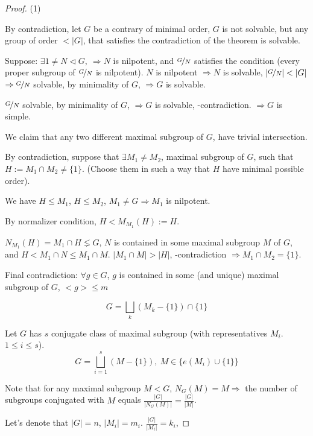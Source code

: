 \documentclass[12pt, a4paper]{article}
\theoremstyle{definition}
\begin{document}
\begin{proof}
    (1) \par
    By contradiction, let $G$ be a contrary of minimal order, $G$ is not solvable, but any 
    group of order $<|G|$, that satisfies the contradiction of the theorem is solvable.
    \par
    Suppose: $\exists 1\neq N\lhd G,\ \Rightarrow N $ is nilpotent, and $\nicefrac{G}{N} $ 
    satisfies the condition (every proper subgroup of $\nicefrac{G}{N} $ is nilpotent). $N$
    is nilpotent $\Rightarrow N $ is solvable, $|\nicefrac{G}{N}|<|G| $ $\Rightarrow 
    \nicefrac{G}{N} $ solvable, by minimality of $G$, $\Rightarrow G$ is solvable. 
    \par
    $\nicefrac{G}{N} $ solvable, by minimality of $G$, $\Rightarrow G$ is solvable, 
    -contradiction. $\Rightarrow G$ is simple.
    \par
    We claim that any two different maximal subgroup of $G$, have trivial intersection.
    \par
    By contradiction, suppose that $\exists M_1 \neq M_2 $, maximal subgroup of $G$, such 
    that $H:=M_1\cap M_2 \neq \{1\}$. (Choose them in such a way that $H$ have minimal 
    possible order).
    \par
    We have $H\leqslant M_1$, $H\leqslant M_2$, $M_1 \neq G \Rightarrow M_1 $ is nilpotent.
    \par
    By normalizer condition, $H <M_{M_1}(H):=H $.
    \par
    $N_{M_1}(H)  =M_1\cap H\lneq G $, $N$ is contained in some maximal subgroup $M$ of $G$, 
    and $H<M_1 \cap N \leqslant M_1 \cap M$.
    $|M_1\cap M| >|H| $, -contradiction $\Rightarrow M_1\cap M_2 =\{1\}$.
    \par
    Final contradiction: $\forall g\in G$, $g$ is contained in some (and unique) maximal 
    subgroup of $G$, $<g>\leqslant m$
    \par
    \[G =\bigsqcup_k (M_k - \{1\})\cap \{1\} \]
    \par
    Let $G$ has $s$ conjugate class of maximal subgroup (with representatives $M_i$. $1
    \leqslant i \leqslant s $).
    \[G = \bigsqcup_{i=1}^s( M-\{1\}),\ M\in \{e(M_i)\cup\{1\} \}\]
    \par
    Note that for any maximal subgroup $M <G$, $N_G(M) = M \Rightarrow$ the number of 
    subgroups conjugated with $M$ equals $\frac{|G|}{|N_G(M)|}= \frac{|G|}{|M|} $.
    \par
    Let's denote that $|G|=n $, $|M_i|=m_i $. $\frac{|G|}{|M_i|} = k_i $,

\end{proof}
\end{document}

